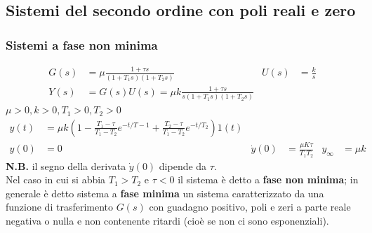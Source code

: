 \documentclass{article}
\numberwithin{equation}{subsection}
\let\oldsubsection\subsection%
\renewcommand{\subsection}{%
  \renewcommand{\theequation}{\thesubsection.\arabic{equation}}%
  \oldsubsection}%
\begin{document}
\subsection{Sistemi del secondo ordine con poli reali e zero}

\subsubsection{Sistemi a fase non minima}
\begin{align*}
    G(s) &= \mu\frac{1 + \tau s}{(1+T_1s)(1+T_2s)} & U(s) &= \frac{k}{s}\\
    Y(s) &= G(s)U(s) = \mu k \frac{1+ \tau s}{s(1+T_1s)(1+T_2s)}
\end{align*}
$\mu>0,k>0,T_1>0,T_2>0$
\begin{align*}
    y(t) &= \mu k \left( 1 - \frac{T_1-\tau}{T_1-T_2} e^{-t/T-1} + \frac{T_2-\tau}{T_1-T_2}e^{-t/T_2} \right)1(t)\\
    y(0) &= 0 & \dot y(0) &= \frac{\mu K \tau}{T_1T_2} & y_{\infty} &= \mu k
\end{align*}
\textbf{N.B.} il segno della derivata $\dot y(0)$ dipende da $\tau$.
\vspace*{0.2cm}\\
Nel caso in cui si abbia $T_1>T_2$ e $\tau<0$ il sistema è detto a \textbf{fase non minima}; in generale è detto sistema a \textbf{fase minima} un sistema caratterizzato da una funzione di trasferimento $G(s)$ con guadagno positivo, poli e zeri a parte reale negativa o nulla e non contenente ritardi (cioè se non ci sono esponenziali).
\end{document}
